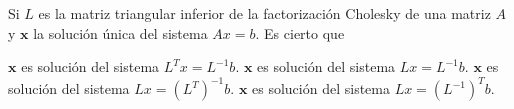 \begin{pregunta}
\begin{cuerpo}
Si $L$ es la matriz triangular inferior de la factorizaci\'on Cholesky de una matriz $A$ y $\mathbf{x}$ la soluci\'on \'unica del sistema $Ax=b$. Es cierto que
\end{cuerpo}

\begin{multicols}{2}
\begin{alternativas}
{$\mathbf{x}$ es soluci\'on del sistema $L^Tx=L^{-1}b$.}
{$\mathbf{x}$ es soluci\'on del sistema $Lx=L^{-1}b$.}
{$\mathbf{x}$ es soluci\'on del sistema $Lx= (L^T)^{-1}b$.}
{$\mathbf{x}$ es soluci\'on del sistema $Lx=(L^{-1})^Tb$.}
\end{alternativas}
\end{multicols}

\justificacion{0cm}
\end{pregunta}